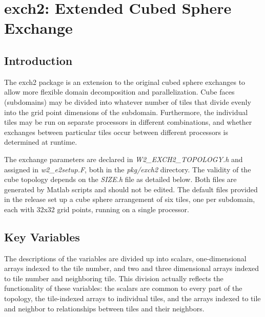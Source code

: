 


\section{exch2: Extended Cubed Sphere Exchange}
\label{sec:exch2}


\subsection{Introduction}

The exch2 package is an extension to the original cubed sphere exchanges
to allow more flexible domain decomposition and parallelization.  Cube faces
(subdomains) may be divided into whatever number of tiles that divide evenly
into the grid point dimensions of the subdomain.  Furthermore, the individual
tiles may be run on separate processors in different combinations,
and whether exchanges between particular tiles occur between different
processors is determined at runtime.

The exchange parameters are declared in {\em W2\_EXCH2\_TOPOLOGY.h} and 
assigned in {\em w2\_e2setup.F}, both in the 
{\em pkg/exch2} directory.  The validity of the cube topology depends
on the {\em SIZE.h} file as detailed below.  Both files are generated by 
Matlab scripts and
should not be edited.  The default files provided in the release set up
a cube sphere arrangement of six tiles, one per subdomain, each with 32x32 grid
points, running on a single processor.  

\subsection{Key Variables}

The descriptions of the variables are divided up into scalars,
one-dimensional arrays indexed to the tile number, and two and three 
dimensional
arrays indexed to tile number and neighboring tile.  This division
actually reflects  the functionality of these variables: the scalars
are common to every part of the topology, the tile-indexed arrays to 
individual tiles, and the arrays indexed to tile and neighbor to 
relationships between tiles and their neighbors.


